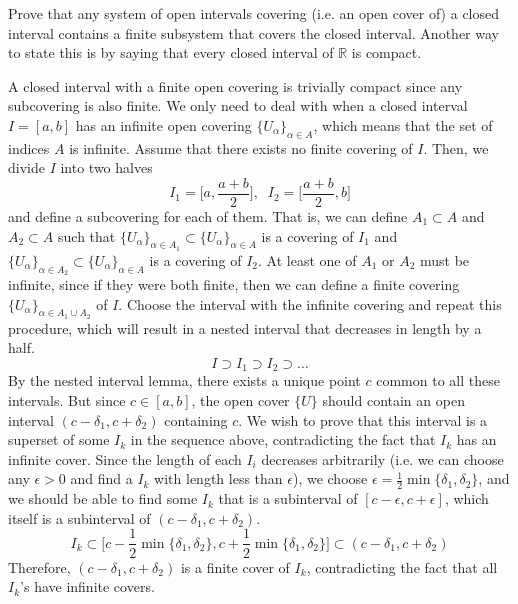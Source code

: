   \begin{exercise}
    Prove that any system of open intervals covering (i.e. an open cover of) a closed interval contains a finite subsystem that covers the closed interval. Another way to state this is by saying that every closed interval of $\mathbb{R}$ is compact. 
  \end{exercise}
  \begin{solution}
    A closed interval with a finite open covering is trivially compact since any subcovering is also finite. We only need to deal with when a closed interval $I = [a, b]$ has an infinite open covering $\{U_\alpha \}_{\alpha \in A}$, which means that the set of indices $A$ is infinite. Assume that there exists no finite covering of $I$. Then, we divide $I$ into two halves 
    \begin{equation}
      I_1 = \Big[ a, \frac{a + b}{2}\Big], \;\; I_2 = \Big[ \frac{a + b}{2}, b \Big]
    \end{equation}
    and define a subcovering for each of them. That is, we can define $A_1 \subset A$ and $A_2 \subset A$ such that $\{U_\alpha\}_{\alpha \in A_1} \subset \{U_\alpha \}_{\alpha \in A}$ is a covering of $I_1$ and $\{U_\alpha\}_{\alpha \in A_2} \subset \{U_\alpha \}_{\alpha \in A}$ is a covering of $I_2$. At least one of $A_1$ or $A_2$ must be infinite, since if they were both finite, then we can define a finite covering $\{U_\alpha\}_{\alpha \in A_1 \cup A_2}$ of $I$. Choose the interval with the infinite covering and repeat this procedure, which will result in a nested interval that decreases in length by a half. 
    \begin{equation}
      I \supset I_1 \supset I_2 \supset \ldots
    \end{equation}
    By the nested interval lemma, there exists a unique point $c$ common to all these intervals. But since $c \in [a, b]$, the open cover $\{U\}$ should contain an open interval $(c - \delta_1, c + \delta_2)$ containing $c$. We wish to prove that this interval is a superset of some $I_k$ in the sequence above, contradicting the fact that $I_k$ has an infinite cover. Since the length of each $I_i$ decreases arbitrarily (i.e. we can choose any $\epsilon > 0$ and find a $I_k$ with length less than $\epsilon$), we choose $\epsilon = \frac{1}{2} \min\{\delta_1, \delta_2 \}$, and we should be able to find some $I_k$ that is a subinterval of $[c - \epsilon, c + \epsilon]$, which itself is a subinterval of $(c - \delta_1, c + \delta_2)$. 
    \begin{equation}
      I_k \subset \Big[ c - \frac{1}{2} \min\{\delta_1, \delta_2 \}, c + \frac{1}{2} \min\{\delta_1, \delta_2 \} \Big] \subset (c - \delta_1, c + \delta_2)
    \end{equation}
    Therefore, $(c - \delta_1, c + \delta_2)$ is a finite cover of $I_k$, contradicting the fact that all $I_k$'s have infinite covers. 
  \end{solution}

